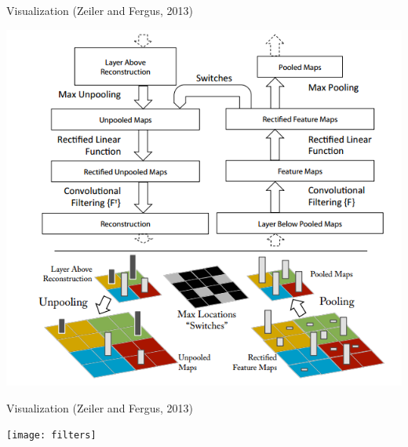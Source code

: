 \documentclass{beamer}
\begin{document}

\begin{frame}{Visualization (Zeiler and Fergus, 2013)}
  \begin{center}
    \includegraphics[height=\textheight]{zf}
  \end{center}
\end{frame}

\begin{frame}{Visualization (Zeiler and Fergus, 2013)}
  \begin{center}
    \texttt{[image: filters]}
  \end{center}
  
\end{frame}
\end{document}
